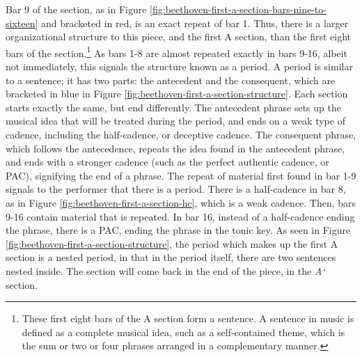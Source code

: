 Bar 9 of the section, as in Figure \ref{fig:beethoven-first-a-section-bars-nine-to-sixteen}\autocite{Henle_1978} and bracketed in red, is an exact repeat of bar 1. Thus, there is a larger organizational structure to this piece, and the first A section, than the first eight bars of the section.\footnote{These first eight bars of the A section form a sentence. A sentence in music is defined as a complete musical idea, such as a self-contained theme, which is the sum or two or four phrases arranged in a complementary manner.} As bars 1-8 are almost repeated exactly in bars 9-16, albeit not immediately, this signals the structure known as a period. A period is similar to a sentence; it has two parts: the antecedent and the consequent, which are bracketed in blue in Figure \ref{fig:beethoven-first-a-section-structure}\autocite{Henle_1978}. Each section starts exactly the same, but end differently. The antecedent phrase sets up the musical idea that will be treated during the period, and ends on a weak type of cadence, including the half-cadence, or deceptive cadence. The consequent phrase, which follows the antecedence, repeats the idea found in the antecedent phrase, and ends with a stronger cadence (such as the perfect authentic cadence, or PAC), signifying the end of a phrase. The repeat of material first found in bar 1-9 signals to the performer that there is a period. There is a half-cadence in bar 8, as in Figure \ref{fig:beethoven-first-a-section-hc}\autocite{Henle_1978}, which is a weak cadence. Then, bars 9-16 contain material that is repeated. In bar 16, instead of a half-cadence ending the phrase, there is a PAC, ending the phrase in the tonic key. As seen in Figure \ref{fig:beethoven-first-a-section-structure}\autocite{Henle_1978}, the period which makes up the first A section is a nested period, in that in the period itself, there are two sentences nested inside. The section will come back in the end of the piece, in the \textit{A`} section. 

